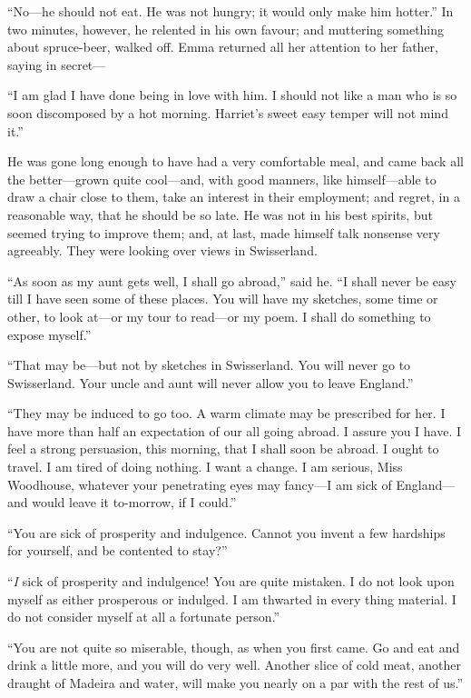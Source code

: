 ``No---he should not eat.  He was not hungry; it would only make
him hotter.''  In two minutes, however, he relented in his own favour;
and muttering something about spruce-beer, walked off.  Emma returned
all her attention to her father, saying in secret---%

``I am glad I have done being in love with him.  I should not like a
man who is so soon discomposed by a hot morning.  Harriet's sweet
easy temper will not mind it.''

He was gone long enough to have had a very comfortable meal, and came
back all the better---grown quite cool---and, with good manners,
like himself---able to draw a chair close to them, take an interest
in their employment; and regret, in a reasonable way, that he
should be so late.  He was not in his best spirits, but seemed
trying to improve them; and, at last, made himself talk nonsense
very agreeably.  They were looking over views in Swisserland.

``As soon as my aunt gets well, I shall go abroad,'' said he.
``I shall never be easy till I have seen some of these places.
You will have my sketches, some time or other, to look at---or my tour
to read---or my poem.  I shall do something to expose myself.''

``That may be---but not by sketches in Swisserland.  You will
never go to Swisserland.  Your uncle and aunt will never allow
you to leave England.''

``They may be induced to go too.  A warm climate may be prescribed
for her.  I have more than half an expectation of our all going abroad.
I assure you I have.  I feel a strong persuasion, this morning,
that I shall soon be abroad.  I ought to travel.  I am tired
of doing nothing.  I want a change.  I am serious, Miss Woodhouse,
whatever your penetrating eyes may fancy---I am sick of England---%
and would leave it to-morrow, if I could.''

``You are sick of prosperity and indulgence.  Cannot you invent
a few hardships for yourself, and be contented to stay?''

``\emph{I} sick of prosperity and indulgence!  You are quite mistaken.
I do not look upon myself as either prosperous or indulged.  I am
thwarted in every thing material.  I do not consider myself at all
a fortunate person.''

``You are not quite so miserable, though, as when you first came.
Go and eat and drink a little more, and you will do very well.
Another slice of cold meat, another draught of Madeira and water,
will make you nearly on a par with the rest of us.''

